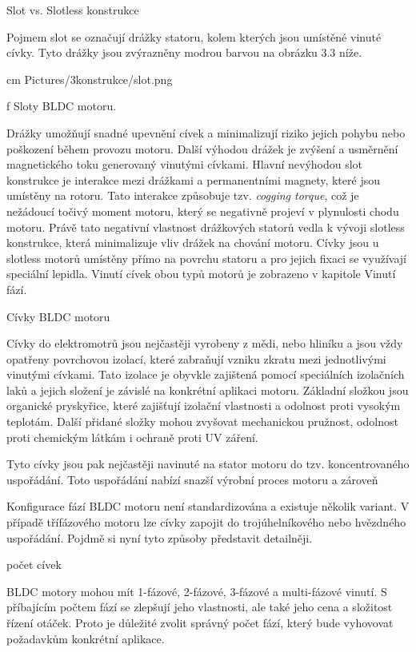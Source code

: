  \secc Slot vs. Slotless konstrukce

 Pojmem slot se označují drážky statoru, kolem kterých jsou umístěné vinuté cívky. Tyto drážky jsou zvýrazněny modrou barvou
 na obrázku 3.3 níže.

 \medskip
  cm \cinspic Pictures/3konstrukce/slot.png 
 \caption/f Sloty BLDC motoru.
 \medskip

 Drážky umožňují snadné upevnění cívek a minimalizují riziko jejich pohybu nebo poškození během provozu motoru. 
 Další výhodou drážek je zvýšení a usměrnění magnetického toku generovaný vinutými cívkami.   
 Hlavní nevýhodou slot konstrukce je interakce mezi drážkami a permanentními magnety, které jsou umístěny na rotoru. 
 Tato interakce způsobuje tzv. {\em cogging torque}, což je nežádoucí točivý moment motoru, který se negativně projeví
  v plynulosti chodu motoru. Právě tato negativní vlastnost drážkových statorů vedla k vývoji slotless konstrukce, která
 minimalizuje vliv drážek na chování motoru. Cívky jsou u slotless motorů umístěny přímo na povrchu statoru a pro jejich fixaci se využívají
 speciální lepidla. Vinutí cívek obou typů motorů je zobrazeno v kapitole Vinutí fází.


 \sec Cívky BLDC motoru

 Cívky do elektromotrů jsou nejčastěji vyrobeny z mědi, nebo hliníku a jsou vždy opatřeny povrchovou izolací, 
 které zabraňují vzniku zkratu mezi jednotlivými vinutými cívkami.
 Tato izolace je obyvkle zajištená pomocí speciálních izolačních laků a jejich složení je závislé na konkrétní aplikaci motoru.
 Základní složkou jsou organické pryskyřice, které zajišťují izolační vlastnosti a odolnost proti vysokým teplotám. Další přidané složky
 mohou zvyšovat mechanickou pružnost, odolnost proti chemickým látkám i ochraně proti UV záření.

Tyto cívky jsou pak nejčastěji navinuté na stator motoru do tzv. koncentrovaného uspořádání.
Toto uspořádání nabízí snazší výrobní proces motoru a zároveň 

Konfigurace fází BLDC motoru není standardizována a existuje několik variant. V případě třífázového motoru lze cívky 
zapojit do trojúhelníkového nebo hvězdného uspořádání.
Pojdmě si nyní tyto způsoby představit detailněji.

\secc počet cívek

BLDC motory mohou mít 1-fázové, 2-fázové, 3-fázové a multi-fázové vinutí.
S příbajícím počtem fází se zlepšují jeho vlastnosti, ale také jeho cena a složitost řízení otáček. 
Proto je důležité zvolit správný počet fází, který bude vyhovovat požadavkům konkrétní aplikace.

